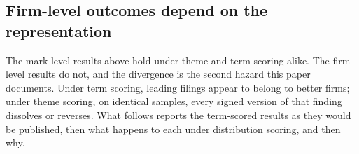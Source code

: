 \subsection{Firm-level outcomes depend on the representation}\label{sec:hazard}

The mark-level results above hold under theme and term scoring alike.
The firm-level results do not, and the divergence is the second hazard
this paper documents. Under term scoring, leading filings appear to belong
to better firms; under theme scoring, on identical samples, every signed
version of that finding dissolves or reverses. What follows reports the
term-scored results as they would be published, then what happens to each
under distribution scoring, and then why.
